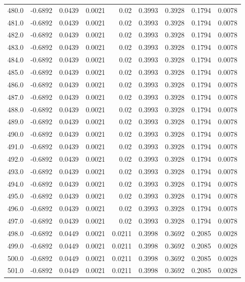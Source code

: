 \begin{longtable}{lrrrrrrrr}
480.0 & -0.6892 & 0.0439 & 0.0021 & 0.02 & 0.3993 & 0.3928 & 0.1794 & 0.0078 \\
481.0 & -0.6892 & 0.0439 & 0.0021 & 0.02 & 0.3993 & 0.3928 & 0.1794 & 0.0078 \\
482.0 & -0.6892 & 0.0439 & 0.0021 & 0.02 & 0.3993 & 0.3928 & 0.1794 & 0.0078 \\
483.0 & -0.6892 & 0.0439 & 0.0021 & 0.02 & 0.3993 & 0.3928 & 0.1794 & 0.0078 \\
484.0 & -0.6892 & 0.0439 & 0.0021 & 0.02 & 0.3993 & 0.3928 & 0.1794 & 0.0078 \\
485.0 & -0.6892 & 0.0439 & 0.0021 & 0.02 & 0.3993 & 0.3928 & 0.1794 & 0.0078 \\
486.0 & -0.6892 & 0.0439 & 0.0021 & 0.02 & 0.3993 & 0.3928 & 0.1794 & 0.0078 \\
487.0 & -0.6892 & 0.0439 & 0.0021 & 0.02 & 0.3993 & 0.3928 & 0.1794 & 0.0078 \\
488.0 & -0.6892 & 0.0439 & 0.0021 & 0.02 & 0.3993 & 0.3928 & 0.1794 & 0.0078 \\
489.0 & -0.6892 & 0.0439 & 0.0021 & 0.02 & 0.3993 & 0.3928 & 0.1794 & 0.0078 \\
490.0 & -0.6892 & 0.0439 & 0.0021 & 0.02 & 0.3993 & 0.3928 & 0.1794 & 0.0078 \\
491.0 & -0.6892 & 0.0439 & 0.0021 & 0.02 & 0.3993 & 0.3928 & 0.1794 & 0.0078 \\
492.0 & -0.6892 & 0.0439 & 0.0021 & 0.02 & 0.3993 & 0.3928 & 0.1794 & 0.0078 \\
493.0 & -0.6892 & 0.0439 & 0.0021 & 0.02 & 0.3993 & 0.3928 & 0.1794 & 0.0078 \\
494.0 & -0.6892 & 0.0439 & 0.0021 & 0.02 & 0.3993 & 0.3928 & 0.1794 & 0.0078 \\
495.0 & -0.6892 & 0.0439 & 0.0021 & 0.02 & 0.3993 & 0.3928 & 0.1794 & 0.0078 \\
496.0 & -0.6892 & 0.0439 & 0.0021 & 0.02 & 0.3993 & 0.3928 & 0.1794 & 0.0078 \\
497.0 & -0.6892 & 0.0439 & 0.0021 & 0.02 & 0.3993 & 0.3928 & 0.1794 & 0.0078 \\
498.0 & -0.6892 & 0.0449 & 0.0021 & 0.0211 & 0.3998 & 0.3692 & 0.2085 & 0.0028 \\
499.0 & -0.6892 & 0.0449 & 0.0021 & 0.0211 & 0.3998 & 0.3692 & 0.2085 & 0.0028 \\
500.0 & -0.6892 & 0.0449 & 0.0021 & 0.0211 & 0.3998 & 0.3692 & 0.2085 & 0.0028 \\
501.0 & -0.6892 & 0.0449 & 0.0021 & 0.0211 & 0.3998 & 0.3692 & 0.2085 & 0.0028 \\

\end{longtable}
